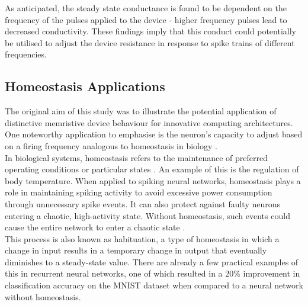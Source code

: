 \noindent As anticipated, the steady state conductance is found to be dependent on the frequency of the pulses applied to the device - higher frequency pulses lead to decreased conductivity. These findings imply that this conduct could potentially be utilised to adjust the device resistance in response to spike trains of different frequencies. 

\subsection[Homeostasis Applications]{Homeostasis Applications}

\noindent The original aim of this study was to illustrate the potential application of distinctive memristive device behaviour for innovative computing architectures. One noteworthy application to emphasise is the neuron's capacity to adjust based on a firing frequency analogous to homeostasis in biology \cite{tien2018homeostatic}. \\

\noindent In biological systems, homeostasis refers to the maintenance of preferred operating conditions or particular states \cite{turrigiano1999homeostatic}. An example of this is the regulation of body temperature. When applied to spiking neural networks, homeostasis plays a role in maintaining spiking activity to avoid excessive power consumption through unnecessary spike events. It can also protect against faulty neurons entering a chaotic, high-activity state. Without homeostasis, such events could cause the entire network to enter a chaotic state \cite{marder2006variability}. \\

\noindent This process is also known as habituation, a type of homeostasis in which a change in input results in a temporary change in output that eventually diminishes to a steady-state value. There are already a few practical examples of this in recurrent neural networks, one of which resulted in a 20\% improvement in classification accuracy on the MNIST dataset when compared to a neural network without homeostasis.\\

